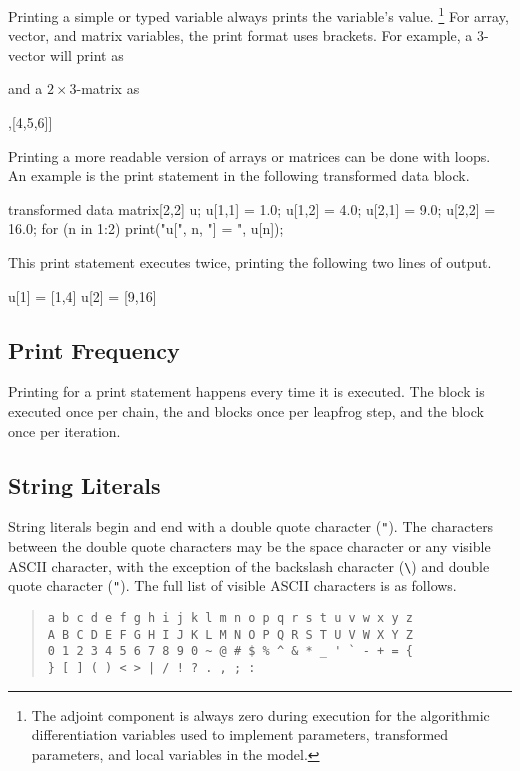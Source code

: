 Printing a simple  or  typed variable always
prints the variable's value.%
%
\footnote{The adjoint component is always zero during execution for
  the algorithmic differentiation variables used to implement
  parameters, transformed parameters, and local variables in the model.}
%
For array, vector, and matrix variables, the print format uses
brackets.  For example, a 3-vector will print as
%
\begin{stancode}
[1,2,3]
\end{stancode}
%
and a $2 \times 3$-matrix as
%
\begin{stancode}
[[1,2,3],[4,5,6]]
\end{stancode}
%

Printing a more readable version of arrays or matrices can be done
with loops.  An example is the print statement in the following
transformed data block.
%
\begin{stancode}
transformed data {
  matrix[2,2] u;
  u[1,1] = 1.0;  u[1,2] = 4.0;
  u[2,1] = 9.0;  u[2,2] = 16.0;
  for (n in 1:2)
    print("u[", n, "] = ", u[n]);
}
\end{stancode}
%
This print statement executes twice, printing the following two lines
of output.
%
\begin{stancode}
u[1] = [1,4]
u[2] = [9,16]
\end{stancode}



\subsection{Print Frequency}

Printing for a print statement happens every time it is executed.  The
 block is executed once per chain, the
 and  blocks once per leapfrog
step, and the  block once per iteration.

\subsection{String Literals}

String literals begin and end with a double quote character
(\Verb|"|).  The characters between the double quote characters may be
the space character or any visible ASCII character, with the exception
of the backslash character (\Verb|\|) and double quote character
(\Verb|"|).  The full list of visible ASCII characters is as follows.
%
\begin{quote}
\begin{Verbatim}
a b c d e f g h i j k l m n o p q r s t u v w x y z
A B C D E F G H I J K L M N O P Q R S T U V W X Y Z
0 1 2 3 4 5 6 7 8 9 0 ~ @ # $ % ^ & * _ ' ` - + = {
} [ ] ( ) < > | / ! ? . , ; :
\end{Verbatim}
\end{quote}

